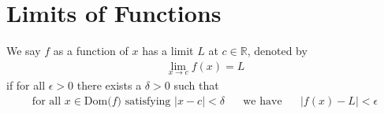 \section{Limits of Functions} \label{limits_of_functions_section}

\begin{definition}
We say $f$ as a function of $x$ has a limit $L$ at $c \in \mathbb{R}$, denoted by
\begin{align*}
    \lim_{x \longrightarrow c} f(x) = L
\end{align*}
if for all $\epsilon > 0$ there exists a $\delta > 0$ such that
\begin{align*}
    \text{for all} \hspace{4pt} x \in \text{Dom($f$)} \hspace{4pt} \text{satisfying} \hspace{4pt} \lvert x - c \rvert < \delta \hspace{20pt} \text{we have} \hspace{20pt} \lvert f(x) - L \rvert < \epsilon
\end{align*}
\label{definition_limit_of_functions}
\end{definition}

